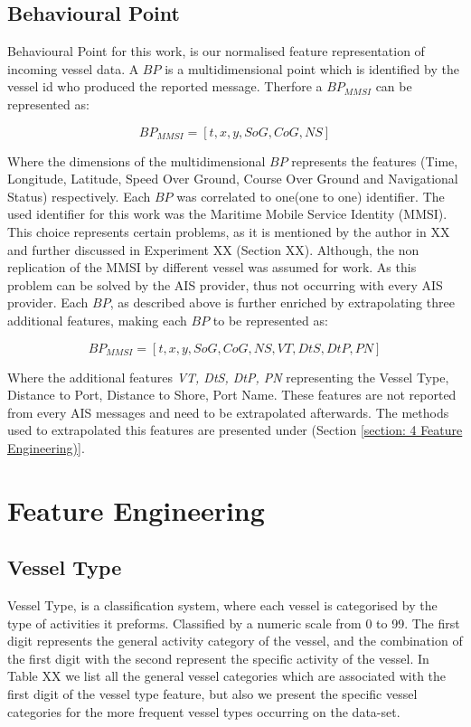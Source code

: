 \subsection{Behavioural Point}
\label{subsection: Behavioural Point}
Behavioural Point for this work, is our normalised feature representation of incoming vessel data. A $BP$ is a multidimensional point which is identified by the vessel id who produced the reported message. Therfore a $BP_{MMSI}$ can be represented as:

\[BP_{MMSI} = [t, x, y, SoG, CoG, NS]\]

Where the dimensions of the multidimensional $BP$ represents the features (Time, Longitude, Latitude, Speed Over Ground, Course Over Ground and Navigational Status) respectively.
Each $BP$ was correlated to one(one to one) identifier. The used identifier for this work was the Maritime Mobile Service Identity (MMSI). This choice represents certain problems, as it is mentioned by the author in XX and further discussed in Experiment XX (Section XX). Although, the non replication of the MMSI by different vessel was assumed for work. As this problem can be solved by the AIS provider, thus not occurring with every AIS provider. 
Each $BP$, as described above is further enriched by extrapolating three additional features, making each $BP$ to be represented as:

\[BP_{MMSI} = [t, x, y, SoG, CoG, NS, VT, DtS, DtP, PN]\]

Where the additional features \emph{VT, DtS, DtP, PN} representing the Vessel Type, Distance to Port, Distance to Shore, Port Name. These features are not reported from every AIS messages and need to be extrapolated afterwards. The methods used to extrapolated this features are presented under (Section \ref{section: 4 Feature Engineering)}. 

\section{Feature Engineering}
\label{section: 4 Feature Engineering}

\subsection{Vessel Type}
\label{subsection: Vessel Type}
Vessel Type, is a classification system, where each vessel is categorised by the type of activities it preforms. Classified by a numeric scale from 0 to 99. The first digit represents the general activity category of the vessel, and the combination of the first digit with the second represent the specific activity of the vessel. In Table XX we list all the general vessel categories which are associated with the first digit of the vessel type feature, but also we present the specific vessel categories for the more frequent vessel types occurring on the data-set.

